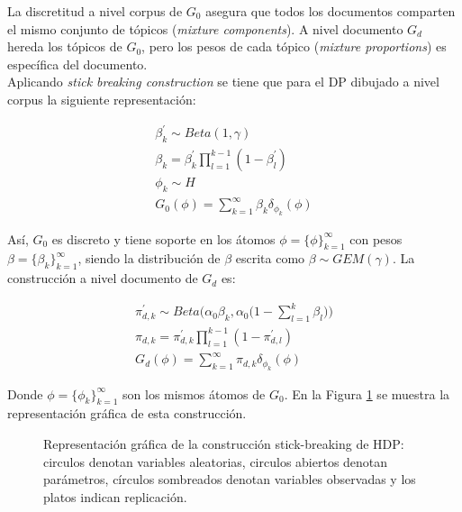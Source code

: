 \documentclass[letterpaper,12pt,oneside]{book} %
\begin{document}
La discretitud a nivel corpus de $G_{0}$ asegura que todos los documentos comparten el mismo conjunto de tópicos (\textit{mixture components}). A nivel documento $G_{d}$ hereda los tópicos de $G_{0}$, pero los pesos de cada tópico (\textit{mixture proportions}) es específica del documento.\\

Aplicando \textit{stick breaking construction} se tiene que para el DP dibujado a nivel corpus la siguiente representación:

\begin{align}
    \beta_{k}^{'} \sim Beta(1, \gamma) \\
    \beta_{k} = \beta_{k}^{'}\prod_{l=1}^{k-1}(1-\beta_{l}^{'})\\
    \phi_{k} \sim H  \\
    G_{0}(\phi)=\sum_{k=1}^{\infty}\beta_{k}\delta_{\phi_{k}}(\phi)
\end{align}

Así, $G_{0}$ es discreto y tiene soporte en los átomos $\phi = \{\phi\}_{k=1}^{\infty}$ con pesos $\beta=\{\beta_{k}\}_{k=1}^{\infty}$, siendo la distribución de $\beta$ escrita como $\beta \sim GEM(\gamma)$. La construcción a nivel documento de $G_{d}$ es:

\begin{align}
    \pi_{d,k}^{'}\sim Beta\big(\alpha_{0}\beta_{k}, \alpha_{0}\big(1-\sum_{l=1}^{k}\beta_{l}\big)\big)\\
    \pi_{d,k} = \pi_{d,k}^{'}\prod_{l=1}^{k-1}(1-\pi_{d,l}^{'})\\
    G_{d}(\phi)=\sum_{k=1}^{\infty}\pi_{d,k}\delta_{\phi_{k}}(\phi)
\end{align}

Donde $\phi = \{\phi_{k}\}_{k=1}^{\infty}$ son los mismos átomos de $G_{0}$. En la Figura \ref{img:hdp_sbc} se muestra la representación gráfica de esta construcción.

\begin{figure}
  \centering
\caption{Representación gráfica de la construcción stick-breaking de HDP: circulos denotan variables aleatorias, circulos abiertos denotan parámetros, círculos sombreados denotan variables observadas y los platos indican replicación.}
\label{img:hdp_sbc}
\end{figure}
\end{document}
